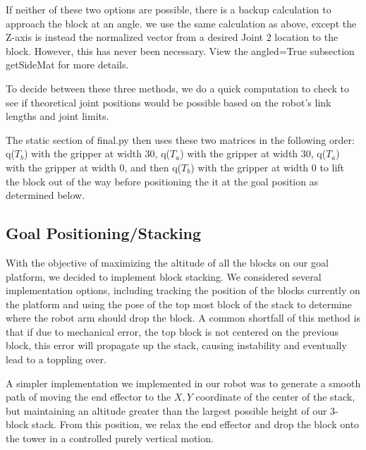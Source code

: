 \documentclass{article}
\begin{document}
    If neither of these two options are possible, there is a backup calculation to approach the block at an angle. we use the same calculation as above, except the Z-axis is instead the normalized vector from a desired Joint 2 location to the block. However, this has never been necessary. View the angled=True subsection getSideMat for more details.
    
    To decide between these three methods,  we do a quick computation to check to see if theoretical joint positions would be possible based on the robot’s link lengths and joint limits.
    
    The static section of final.py then uses these two matrices in the following order: q($T_b$) with the gripper at width 30, q($T_a$) with the gripper at width 30, q($T_a$) with the gripper at width 0, and then q($T_b$) with the gripper at width 0 to lift the block out of the way before positioning the it at the goal position as determined below.

    
    \subsection{Goal Positioning/Stacking}
    
        With the objective of maximizing the altitude of all the blocks on our goal platform, we decided to implement block stacking. We considered several implementation options, including tracking the position of the blocks currently on the platform and using the pose of the top most block of the stack to determine where the robot arm should drop the block. A common shortfall of this method is that if due to mechanical error, the top block is not centered on the previous block, this error will propagate up the stack, causing instability and eventually lead to a toppling over.
		
		A simpler implementation we implemented in our robot was to generate a smooth path of moving the end effector to the $X, Y$ coordinate of the center of the stack, but maintaining an altitude greater than the largest possible height of our 3-block stack. From this position, we relax the end effector and drop the block onto the tower in a controlled purely vertical motion.
    
\end{document}
